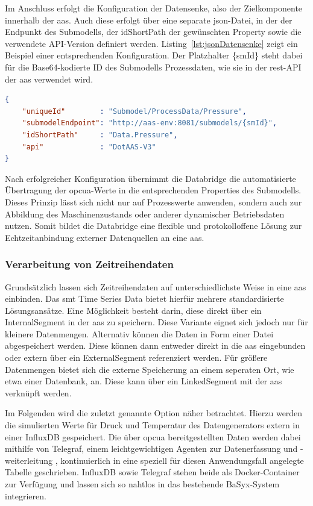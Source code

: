 Im Anschluss erfolgt die Konfiguration der Datensenke, also der Zielkomponente innerhalb der \acs{aas}.
Auch diese erfolgt über eine separate \acs{json}-Datei, in der der Endpunkt des Submodells, der idShortPath der gewünschten Property sowie die verwendete API-Version definiert werden.
Listing~\ref{lst:jsonDatensenke} zeigt ein Beispiel einer entsprechenden Konfiguration.
Der Platzhalter \{smId\} steht dabei für die Base64-kodierte ID des Submodells Prozessdaten, wie sie in der \acs{rest}-API der \acs{aas} verwendet wird.

\begin{lstlisting}[language=json, caption={Beispielhafte \acs{json}-Konfiguration einer Datensenke}, label={lst:jsonDatensenke}]
{
    "uniqueId"        : "Submodel/ProcessData/Pressure",
    "submodelEndpoint": "http://aas-env:8081/submodels/{smId}",
    "idShortPath"     : "Data.Pressure",
    "api"             : "DotAAS-V3"
}
\end{lstlisting}

Nach erfolgreicher Konfiguration übernimmt die Databridge die automatisierte Übertragung der \acs{opcua}-Werte in die entsprechenden Properties des Submodells.
Dieses Prinzip lässt sich nicht nur auf Prozesswerte anwenden, sondern auch zur Abbildung des Maschinenzustands oder anderer dynamischer Betriebsdaten nutzen.
Somit bildet die Databridge eine flexible und protokolloffene Lösung zur Echtzeitanbindung externer Datenquellen an eine \acs{aas}.


\subsubsection{Verarbeitung von Zeitreihendaten}
\label{sec: VerarbeitungZeitreihen}
Grundsätzlich lassen sich Zeitreihendaten auf unterschiedlichste Weise in eine \acs{aas} einbinden.
Das \acs{smt} Time Series Data \cite{SpezifikationTimeSeriesData} bietet hierfür mehrere standardisierte Lösungsansätze.
Eine Möglichkeit besteht darin, diese direkt über ein InternalSegment in der \acs{aas} zu speichern.
Diese Variante eignet sich jedoch nur für kleinere Datenmengen.
Alternativ können die Daten in Form einer Datei abgespeichert werden.
Diese können dann entweder direkt in die \acs{aas} eingebunden oder extern über ein ExternalSegment referenziert werden.
Für größere Datenmengen bietet sich die externe Speicherung an einem seperaten Ort, wie etwa einer Datenbank, an.
Diese kann über ein LinkedSegment mit der \acs{aas} verknüpft werden.

Im Folgenden wird die zuletzt genannte Option näher betrachtet.
Hierzu werden die simulierten Werte für Druck und Temperatur des Datengenerators extern in einer InfluxDB gespeichert.
Die über \acs{opcua} bereitgestellten Daten werden dabei mithilfe von Telegraf, einem leichtgewichtigen Agenten zur Datenerfassung und -weiterleitung \cite{Influx}, kontinuierlich in eine speziell für diesen Anwendungsfall angelegte Tabelle geschrieben.
InfluxDB sowie Telegraf stehen beide als Docker-Container zur Verfügung und lassen sich so nahtlos in das bestehende BaSyx-System integrieren.

